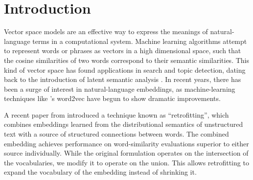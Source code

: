\documentclass[letterpaper]{article}
\title{\thetitle}
\begin{document}
\maketitle
\begin{abstract}
Generating vector representations of words with machine learning has become an
increasing successful approach for semantic analysis. In particular, they have
become very accurate at identifying related words, like a human would. In this
paper, we show the effectiveness of combining existing embeddings learned by
GloVe \cite{pennington2014glove} with structured knowledge from the semantic
network ConceptNet 5 \cite{speer2012conceptnet}, taking care to merge them into
a common word representation. The resulting vector space has a larger vocabulary
than either source, can represent word meanings in multiple languages, and
achieves state-of-the-art performance on word similarity evaluations. In
particular, its score of $\rho = \scoreRW{}$ on an evaluation of rare words
\cite{luong2013rw} is 13.6\% higher than the previous best known system.
\end{abstract}

\section{Introduction}
Vector space models are an effective way to express the meanings of
natural-language terms in a computational system. Machine learning algorithms
attempt to represent words or phrases as vectors in a high dimensional space,
such that the cosine similarities of two words correspond to their semantic
similarities. This kind of vector space has found applications in search and
topic detection, dating back to the introduction of latent semantic analysis
\cite{deerwester1990indexing}.
In recent years, there has been a surge of
interest in natural-language embeddings, as machine-learning techniques like
's word2vec have begun to show dramatic improvements.

A recent paper from  introduced a technique
known as ``retrofitting'', which combines embeddings learned from the
distributional semantics of unstructured text with a source of structured
connections between words. The combined embedding achieves performance on
word-similarity evaluations superior to either source individually. While the
original formulation operates on the intersection of the vocabularies, we modify
it to operate on the union. This allows retrofitting to expand the vocabulary of
the embedding instead of shrinking it.
\end{document}
